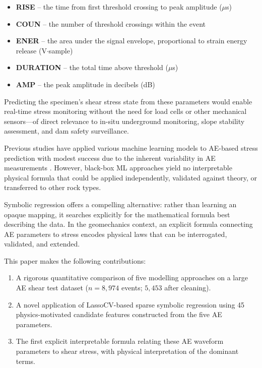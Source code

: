 \documentclass[12pt,a4paper]{article}
\begin{document}
\begin{itemize}
  \item \textbf{RISE} -- the time from first threshold crossing to peak amplitude
        ($\mu$s)
  \item \textbf{COUN} -- the number of threshold crossings within the event
  \item \textbf{ENER} -- the area under the signal envelope, proportional to
        strain energy release (V$\cdot$sample)
  \item \textbf{DURATION} -- the total time above threshold ($\mu$s)
  \item \textbf{AMP} -- the peak amplitude in decibels (dB)
\end{itemize}

Predicting the specimen's shear stress state from these parameters would enable
real-time stress monitoring without the need for load cells or other mechanical
sensors---of direct relevance to in-situ underground monitoring, slope stability
assessment, and dam safety surveillance.

Previous studies have applied various machine learning models to AE-based stress
prediction with modest success due to the inherent variability in AE measurements
\citep{grosse2008, nair2010}. However, black-box ML approaches yield no
interpretable physical formula that could be applied independently, validated
against theory, or transferred to other rock types.

Symbolic regression offers a compelling alternative: rather than learning an
opaque mapping, it searches explicitly for the mathematical formula best
describing the data. In the geomechanics context, an explicit formula connecting
AE parameters to stress encodes physical laws that can be interrogated,
validated, and extended.

This paper makes the following contributions:

\begin{enumerate}
  \item A rigorous quantitative comparison of five modelling approaches on a
        large AE shear test dataset ($n = 8{,}974$ events; $5{,}453$ after
        cleaning).
  \item A novel application of LassoCV-based sparse symbolic regression using 45
        physics-motivated candidate features constructed from the five AE
        parameters.
  \item The first explicit interpretable formula relating these AE waveform
        parameters to shear stress, with physical interpretation of the dominant
        terms.
\end{enumerate}
\end{document}
